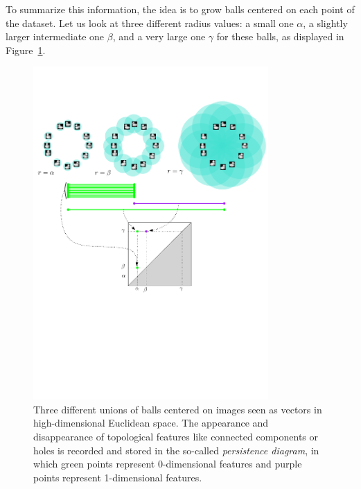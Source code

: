 To summarize this information, the idea is to grow balls centered on each point of the dataset. 
Let us look at three different radius values: a small one $\alpha$, a slightly larger intermediate one $\beta$, and
a very large one $\gamma$ for these balls, as displayed in Figure~\ref{fig:ExamplePersistence}.

\begin{figure}[h]\centering
\includegraphics[width=0.8\textwidth]{figures/ExamplePersistence}
\caption[Persistence diagrams induced by growing balls]{\label{fig:ExamplePersistence} Three different unions of balls centered on images seen as vectors in high-dimensional Euclidean space.
The appearance and disappearance of topological features like connected components or holes is recorded and stored in the so-called {\em persistence diagram},
in which green points represent 0-dimensional features and purple points represent 1-dimensional features.}
\end{figure}	

